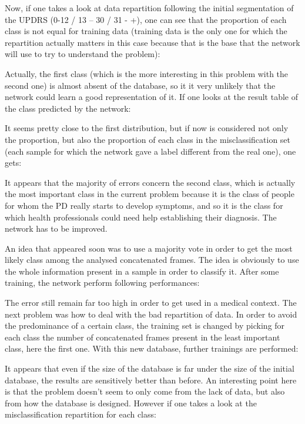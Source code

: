 \documentclass{report}
\begin{document}
		 Now, if one takes a look at data repartition following the initial segmentation of the UPDRS (0-12 / 13 – 30 / 31 - +), one can see that the proportion of each class is not equal for training data (training data is the only one for which the repartition actually matters in this case because that is the base that the network will use to try to understand the problem):
		 
		 
		 Actually, the first class (which is the more interesting in this problem with the second one) is almost absent of the database, so it it very unlikely that the network could learn a good representation of it.
		 If one looks at the result table of the class predicted by the network:
		 
		 
		 It seems pretty close to the first distribution, but if now is considered not only the proportion, but also the proportion of each class in the misclassification set (each sample for which the network gave a label different from the real one), one gets:
		 
		 
		 It appears that the majority of errors concern the second class, which is actually the most important class in the current problem because it is the class of people for whom the PD really starts to develop symptoms, and so it is the class for which health professionals could need help establishing their diagnosis. The network has to be improved.
		 
		 An idea that appeared soon was to use a majority vote in order to get the most likely class among the analysed concatenated frames. The idea is obviously to use the whole information present in a sample in order to classify it. After some training, the network perform following performances:
		 
		 
		 The error still remain far too high in order to get used in a medical context. The next problem was how to deal with the bad repartition of data. In order to avoid the predominance of a certain class, the training set is changed by picking for each class the number of concatenated frames present in the least important class, here the first one. With this new database, further trainings are performed:
		 
		 
		 It appears that even if the size of the database is far under the size of the initial database, the results are sensitively better than before. An interesting point here is that the problem doesn't seem to only come from the lack of data, but also from how the database is designed. However if one takes a look at the misclassification repartition for each class:
		 
\end{document}
